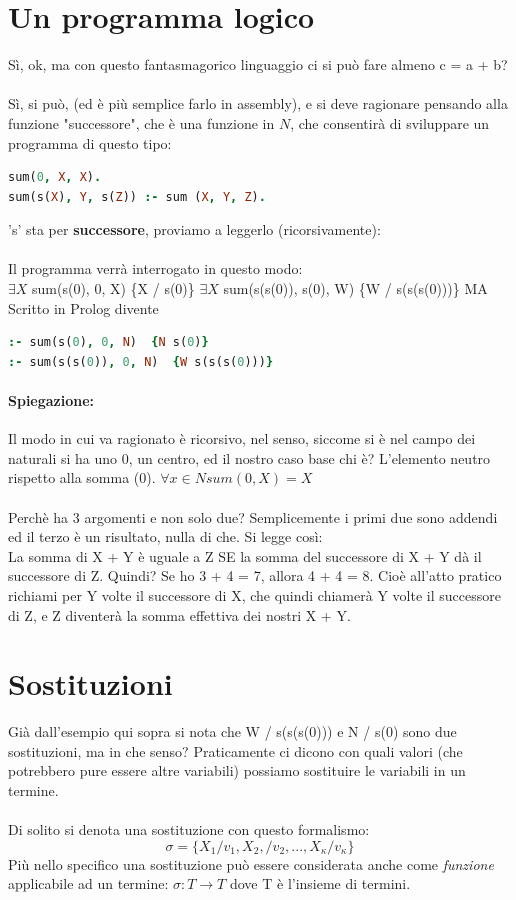 \documentclass[12pt, a4paper, openany, oneside]{book}
\begin{document}
{\section{Un programma logico}
Sì, ok, ma con questo fantasmagorico linguaggio ci si può fare almeno c = a + b?
\\ \\
Sì, si può, (ed è più semplice farlo in assembly), e si deve ragionare pensando
alla funzione "successore", che è una funzione in $N$, che consentirà di 
sviluppare un programma di questo tipo:
\begin{lstlisting}[language=prolog]
sum(0, X, X).
sum(s(X), Y, s(Z)) :- sum (X, Y, Z).
\end{lstlisting} 
's' sta per \textbf{successore}, proviamo a leggerlo (ricorsivamente): \\ \\
Il programma verrà interrogato in questo modo: \\
$\exists X$ sum(s(0), 0, X) \{X / s(0)\}
$\exists X$ sum(s(s(0)), s(0), W) \{W / s(s(s(0)))\} MA
Scritto in Prolog divente 
\begin{lstlisting}[language=prolog]
:- sum(s(0), 0, N)  {N s(0)}
:- sum(s(s(0)), 0, N)  {W s(s(s(0)))}
\end{lstlisting}
\paragraph{Spiegazione: } Il modo in cui va ragionato è ricorsivo, nel senso, 
siccome si è nel campo dei naturali si ha uno 0, un centro, ed il nostro caso
base chi è? L'elemento neutro rispetto alla somma (0). 
$\forall x \in N sum(0, X) = X$ \\ \\
Perchè ha 3 argomenti e non solo due? Semplicemente i primi due sono addendi ed 
il terzo è un risultato, nulla di che. Si legge così: \\
La somma di X + Y è uguale a Z SE la somma del successore di X + Y dà il successore di Z.
Quindi? Se ho 3 + 4 = 7, allora 4 + 4 = 8. Cioè all'atto pratico richiami per Y
volte il successore di X, che quindi chiamerà Y volte il successore di Z, e Z
diventerà la somma effettiva dei nostri X + Y.
\section{Sostituzioni}
Già dall'esempio qui sopra si nota che {W / s(s(s(0)))} e {N / s(0)} sono due
sostituzioni, ma in che senso? Praticamente ci dicono con quali valori (che 
potrebbero pure essere altre variabili) possiamo sostituire le variabili in un 
termine. \\ \\
Di solito si denota una sostituzione con questo formalismo:
\[
\sigma = \{ X_{1} / v_{1}, X_{2}, / v_{2}, ... , X_{\kappa} / v_{\kappa}\}
\]
Più nello specifico una sostituzione può essere considerata anche come 
\textit{funzione} applicabile ad un termine: $\sigma : T \to T$ dove T è l'insieme
di termini. \\ 
}
\end{document}
